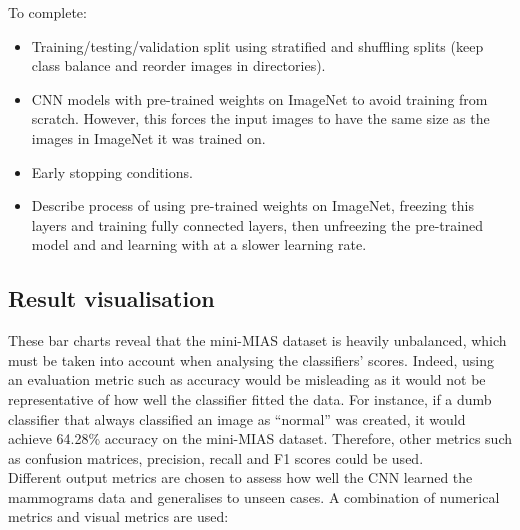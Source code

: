 To complete:
\begin{itemize}
    \item Training/testing/validation split using stratified and shuffling splits (keep class balance and reorder images in directories).
    \item CNN models with pre-trained weights on ImageNet to avoid training from scratch. However, this  forces the input images to have the same size as the images in ImageNet it was trained on.
    \item Early stopping conditions.
    \item Describe process of using pre-trained weights on ImageNet, freezing this layers and training fully connected layers, then unfreezing the pre-trained model and and learning with at a slower learning rate.
\end{itemize}


\subsection{Result visualisation}
\label{sec:design-results-visualisation}

These bar charts reveal that the mini-MIAS dataset is heavily unbalanced, which must be taken into account when analysing the classifiers' scores. Indeed, using an  evaluation metric such as accuracy would be misleading as it would not be representative of how well the classifier fitted the data. For instance, if a dumb classifier that always classified an image as ``normal'' was created, it would achieve 64.28\% accuracy on the mini-MIAS dataset. Therefore, other metrics such as confusion matrices, precision, recall and F1 scores could be used.\\

Different output metrics are chosen to assess how well the CNN learned the mammograms data and generalises to unseen cases. A combination of numerical metrics and visual metrics are used:

